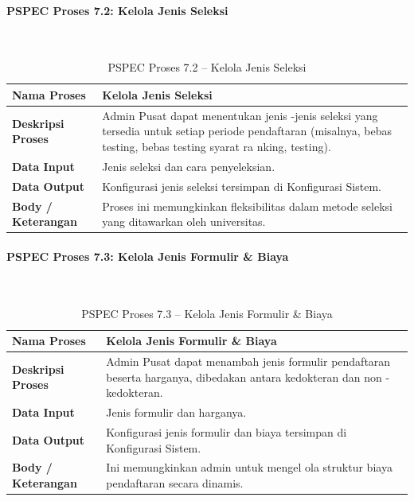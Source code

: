 \paragraph{PSPEC Proses 7.2: Kelola Jenis Seleksi}~\\
\begin{longtable}{|p{}|p{}|}
	\caption{PSPEC Proses 7.2 -- Kelola Jenis Seleksi}
	\label{table:3.pspec72}\\
	\hline
	\textbf{Nama Proses} & Kelola Jenis Seleksi \\
	\hline
	\textbf{Deskripsi Proses} & Admin Pusat dapat menentukan jenis -jenis seleksi yang tersedia untuk setiap periode pendaftaran (misalnya, bebas testing, bebas testing syarat ra nking, testing). \\
	\hline
	\textbf{Data Input} & Jenis seleksi dan cara penyeleksian. \\
	\hline
	\textbf{Data Output} & Konfigurasi jenis seleksi tersimpan di Konfigurasi Sistem. \\
	\hline
	\textbf{Body / Keterangan} & Proses ini memungkinkan fleksibilitas dalam metode seleksi yang ditawarkan oleh universitas. \\
	\hline
\end{longtable}


\paragraph{PSPEC Proses 7.3: Kelola Jenis Formulir \& Biaya}~\\
\begin{longtable}{|p{}|p{}|}
	\caption{PSPEC Proses 7.3 -- Kelola Jenis Formulir \& Biaya}
	\label{table:3.pspec73}\\
	\hline
	\textbf{Nama Proses} & Kelola Jenis Formulir \& Biaya \\
	\hline
	\textbf{Deskripsi Proses} & Admin Pusat dapat menambah jenis formulir pendaftaran beserta harganya, dibedakan antara kedokteran dan non -kedokteran. \\
	\hline
	\textbf{Data Input} & Jenis formulir dan harganya. \\
	\hline
	\textbf{Data Output} & Konfigurasi jenis formulir dan biaya tersimpan di Konfigurasi Sistem. \\
	\hline
	\textbf{Body / Keterangan} & Ini memungkinkan admin untuk mengel ola struktur biaya pendaftaran secara dinamis. \\
	\hline
\end{longtable}


